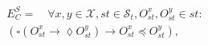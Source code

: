 \documentclass[conference]{IEEEtran}
\begin{document}
	\begin{align}\label{eqn:Causal}
	\begin{split}
	E^S_C =   \quad \forall x,y \in \mathcal{X}, \mathit{st} \in \mathcal{S}_t, O_\mathit{st}^x, O_\mathit{st}^{y} \in \mathit{st}: \\ \left( \square \left( O_\mathit{st}^x \rightarrow \lozenge O_\mathit{st}^{y} \right)
	\rightarrow O_\mathit{st}^x \preccurlyeq O_\mathit{st}^{y} \right),
	\end{split}
	\end{align} %
\end{document}
